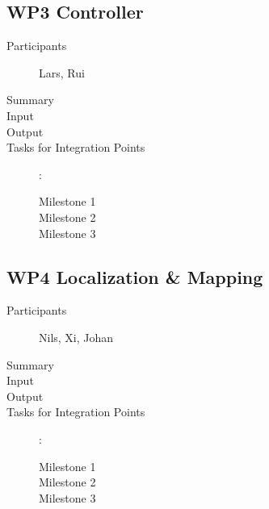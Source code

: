 \documentclass[11pt,a4paper]{article}
\begin{document}
\subsection{WP3 Controller}

\begin{description}
\item[Participants] Lars, Rui
\item[Summary]
\item[Input]
\item[Output]
\item[Tasks for Integration Points]:\
	\begin{description}
		\item[Milestone 1]
		\item[Milestone 2]
		\item[Milestone 3] 
	\end{description}	 
\end{description}

\subsection{WP4 Localization \& Mapping}

\begin{description}
\item[Participants] Nils, Xi, Johan
\item[Summary]
\item[Input]
\item[Output]
\item[Tasks for Integration Points]:\
	\begin{description}
		\item[Milestone 1]
		\item[Milestone 2]
		\item[Milestone 3] 
	\end{description}	 
\end{description}
\end{document}
